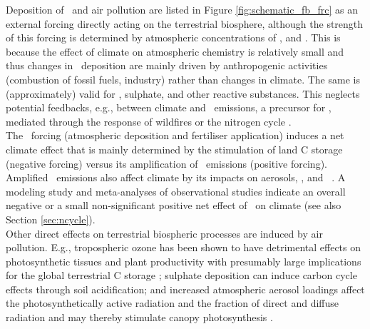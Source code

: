 Deposition of \nr\ and air pollution are listed in Figure \ref{fig:schematic_fb_frc} as an external forcing directly acting on the terrestrial biosphere, although the strength of this forcing is determined by atmospheric concentrations of \nox , and \nhy . This is because the effect of climate on atmospheric chemistry is relatively small \citep{dentener06} and thus changes in \nr\ deposition are mainly driven by anthropogenic activities (combustion of fossil fuels, industry) rather than changes in climate. The same is (approximately) valid for \ooot , sulphate, and other reactive substances. This neglects potential feedbacks, e.g., between climate and \nox\ emissions, a precursor for \ooot , mediated through the response of wildfires or the nitrogen cycle \citep{arneth10ngeo}.\\

The \nr\ forcing (atmospheric deposition and fertiliser application) induces a net climate effect that is mainly determined by the stimulation of land C storage (negative forcing) versus its amplification of \nno\ emissions (positive forcing). Amplified \nox\ emissions also affect climate by its impacts on aerosols, \ooot , and \chh\ \citep{erisman11}. A modeling study \citep{zaehle11ngeo} and meta-analyses of observational studies indicate an overall negative \citep{vangroenigen11, liugreaver09} or a small non-significant positive net effect of \nr\ on climate \citep{zaehle11ngeo} (see also Section \ref{sec:ncycle}).\\

Other direct effects on terrestrial biospheric processes are induced by air pollution. E.g., tropospheric ozone has been shown to have detrimental effects on photosynthetic tissues and plant productivity with presumably large implications for the global terrestrial C storage \citep{sitch07}; sulphate deposition can induce carbon cycle effects through soil acidification; and increased atmospheric aerosol loadings affect the photosynthetically active radiation and the fraction of direct and diffuse radiation and may thereby stimulate canopy photosynthesis \citep{mercado09}.

